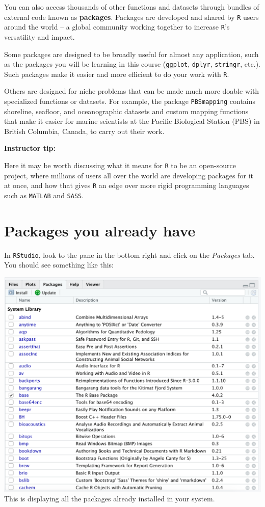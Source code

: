 \documentclass[
]{book}
\begin{document}
You can also access thousands of other functions and datasets through bundles of external code known as \textbf{packages}. Packages are developed and shared by \texttt{R} users around the world -- a global community working together to increase \texttt{R}'s versatility and impact.

Some packages are designed to be broadly useful for almost any application, such as the packages you will be learning in this course (\texttt{ggplot}, \texttt{dplyr}, \texttt{stringr}, etc.). Such packages make it easier and more efficient to do your work with \texttt{R}.

Others are designed for niche problems that can be made much more doable with specialized functions or datasets. For example, the package \texttt{PBSmapping} contains shoreline, seafloor, and oceanographic datasets and custom mapping functions that make it easier for marine scientists at the Pacific Biological Station (PBS) in British Columbia, Canada, to carry out their work.

\leavevmode\hypertarget{tip-text}{}%
\textbf{Instructor tip:}

Here it may be worth discussing what it means for \texttt{R} to be an open-source project, where millions of users all over the world are developing packages for it at once, and how that gives \texttt{R} an edge over more rigid programming languages such as \texttt{MATLAB} and \texttt{SASS}.

\hypertarget{packages-you-already-have}{%
\section*{Packages you already have}\label{packages-you-already-have}}

In \texttt{RStudio}, look to the pane in the bottom right and click on the \emph{Packages} tab. You should see something like this:

\includegraphics{img/rstudio_packages.png}
This is displaying all the packages already installed in your system.
\end{document}
